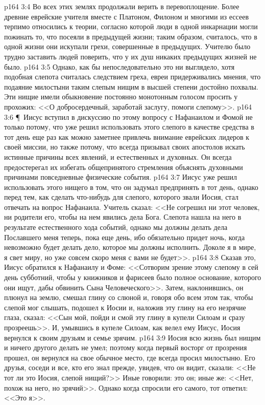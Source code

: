 \vs p164 3:4 Во всех этих землях продолжали верить в перевоплощение. Более древние еврейские учителя вместе с Платоном, Филоном и многими из ессеев терпимо относились к теории, согласно которой люди в одной инкарнации могли пожинать то, что посеяли в предыдущей жизни; таким образом, считалось, что в одной жизни они искупали грехи, совершенные в предыдущих. Учителю было трудно заставить людей поверить, что у их душ никаких предыдущих жизней не было.
\vs p164 3:5 Однако, как бы непоследовательно это ни выглядело, хотя подобная слепота считалась следствием греха, евреи придерживались мнения, что подаяние милостыни таким слепым нищим в высшей степени достойно похвалы. Эти нищие имели обыкновение постоянно монотонным голосом просить у прохожих: <<О добросердечный, заработай заслугу, помоги слепому>>.
\vs p164 3:6 \P\ Иисус вступил в дискуссию по этому вопросу с Нафанаилом и Фомой не только потому, что уже решил использовать этого слепого в качестве средства в тот день еще раз как можно заметнее привлечь внимание еврейских лидеров к своей миссии, но также потому, что всегда призывал своих апостолов искать истинные причины всех явлений, и естественных и духовных. Он всегда предостерегал их избегать общепринятого стремления объяснять духовными причинами повседневные физические события.
\vs p164 3:7 Иисус уже решил использовать этого нищего в том, что он задумал предпринять в тот день, однако перед тем, как сделать что\hyp{}нибудь для слепого, которого звали Иосия, стал отвечать на вопрос Нафанаила. Учитель сказал: <<Не согрешил ни этот человек, ни родители его, чтобы на нем явились дела Бога. Слепота нашла на него в результате естественного хода событий, однако мы должны делать дела Пославшего меня теперь, пока еще день, ибо обязательно придет ночь, когда невозможно будет делать дело, которое мы должны исполнить. Доколе я в мире, я свет миру, но уже совсем скоро меня с вами не будет>>.
\vs p164 3:8 Сказав это, Иисус обратился к Нафанаилу и Фоме: <<Сотворим зрение этому слепому в сей день субботний, чтобы у книжников и фарисеев было полное основание, которого они ищут, дабы обвинить Сына Человеческого>>. Затем, наклонившись, он плюнул на землю, смешал глину со слюной и, говоря обо всем этом так, чтобы слепой мог слышать, подошел к Иосии и, наложив эту глину на его незрячие глаза, сказал: <<Сын мой, пойди и смой эту глину в купели Силоам и сразу прозреешь>>. И, умывшись в купеле Силоам, как велел ему Иисус, Иосия вернулся к своим друзьям и семье зрячим.
\vs p164 3:9 Иосия всю жизнь был нищим и ничего другого делать не умел; поэтому когда первый восторг от прозрения прошел, он вернулся на свое обычное место, где всегда просил милостыню. Его друзья, соседи и все, кто его знал прежде, увидев, что он видит, сказали: <<Не тот ли это Иосия, слепой нищий?>> Иные говорили: это он; иные же: <<Нет, похож на него, но зрячий>>. Однако когда спросили его самого, тот ответил: <<Это я>>.
